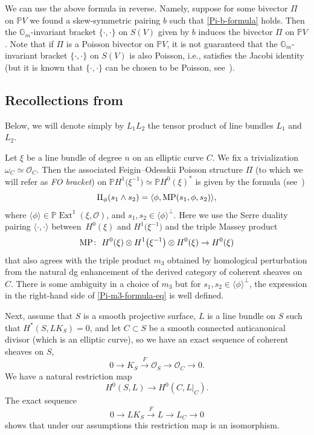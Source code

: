 \documentclass[10pt,a4paper]{amsart}
\numberwithin{equation}{section}
\newcommand{\we}{\wedge}
\renewcommand{\P}{{\mathbb P}}
\newcommand{\ot}{\otimes}
\newcommand{\Ext}{\operatorname{Ext}}
\newcommand{\OO}{{\mathcal O}}
\newcommand{\sub}{\subset}
\newcommand{\om}{\omega}
\newcommand{\G}{{\mathbb G}}
\newcommand{\lan}{\langle}
\newcommand{\ran}{\rangle}
\begin{document}
We can use the above formula in reverse. Namely, suppose for some bivector $\Pi$ on $\P V$ we found a skew-symmetric pairing $b$ such that
\eqref{Pi-b-formula} holds. Then the $\G_m$-invariant bracket $\{\cdot,\cdot\}$ on $S(V)$ given by $b$ induces the bivector $\Pi$ on $\P V$.
Note that if $\Pi$ is a Poisson bivector on $\P V$, it is not guaranteed that the $\G_m$-invariant bracket $\{\cdot,\cdot\}$ on $S(V)$ is also Poisson, i.e.,
satisfies the Jacobi identity (but it is known that $\{\cdot,\cdot\}$ can be chosen to be Poisson, see~\cite{B, P95}).

\subsection[Recollections from~\protect{[3]}]{Recollections from~\cite{HP}}

Below, we will denote simply by $L_1L_2$ the tensor product of line bundles $L_1$ and $L_2$.

Let $\xi$ be a line bundle of degree $n$ on an elliptic curve $C$. We fix a trivialization $\om_C\simeq \OO_C$.
Then the associated Feigin--Odesskii Poisson structure $\Pi$ (to which we will refer as {\it FO bracket}) on $\P H^1\big(\xi^{-1}\big)\simeq \P H^0(\xi)^*$ is given by the formula (see~\cite[Lemma~2.1]{HP})
\begin{equation}\label{Pi-m3-formula-eq}
\Pi_{\phi}(s_1\we s_2)=\lan \phi, {\rm MP}(s_1,\phi,s_2)\ran,
\end{equation}
where $\lan\phi\ran\in \P\Ext^1(\xi,\OO)$, and $s_1,s_2\in \lan \phi\ran^\perp$.
Here we use the Serre duality pairing $\lan \cdot,\cdot\ran$ between~$H^0(\xi)$ and $H^1\big(\xi^{-1}\big)$ and the triple Massey product
\[
{\rm MP}\colon \ H^0(\xi)\ot H^1\big(\xi^{-1}\big)\ot H^0(\xi)\to H^0(\xi)
\]
that also agrees with the triple product $m_3$ obtained by homological perturbation from the natural dg enhancement of the derived category of coherent sheaves on $C$.
There is some ambiguity in a choice of $m_3$ but for $s_1,s_2\in \lan\phi\ran^{\perp}$, the expression in the right-hand side of
\eqref{Pi-m3-formula-eq} is well defined.

Next, assume that $S$ is a smooth projective surface, $L$ is a line bundle on $S$ such that $H^*(S,LK_S)=0$, and let $C\sub S$
be a smooth connected anticanonical divisor (which is an elliptic curve), so we have an exact sequence of coherent sheaves on $S$,
\begin{equation}
0\to K_S\overset{F}{\to} \OO_S\to \OO_C\to 0.\label{KS-O-OC-ex-seq}
\end{equation}
We have a natural restriction map
\[H^0(S,L)\to H^0(C,L|_C).\]
The exact sequence
\begin{equation}
0\to LK_S\overset{F}{\to} L\to L_C\to 0\label{LKS-L-LC-ex-seq}
\end{equation}
shows that under our assumptions this restriction map is an isomorphism.
\end{document}

